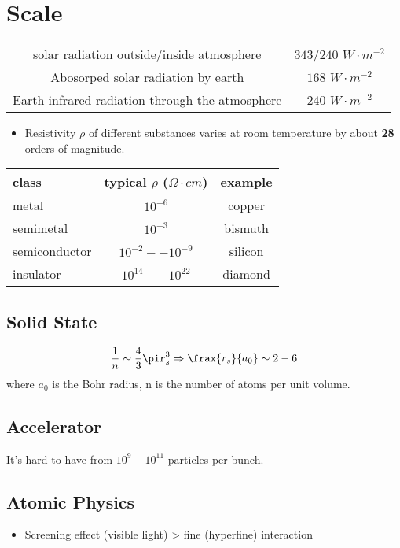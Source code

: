 \section{Scale}



\newpage
\begin{table}
    \centering
    \begin{tabular}{c | c}
	\hline
	solar radiation outside/inside atmosphere   & $343/240$ $W \cdot m^{-2}$	\\
	Abosorped solar radiation by earth  & $168$ $W \cdot m^{-2}$	\\
	Earth infrared radiation through the atmosphere	& $240$ $W \cdot m^{-2}$    \\
	\hline
    \end{tabular}
\end{table}

\begin{itemize}
    \item Resistivity $\rho$ of different substances varies at room temperature by about \textbf{28} orders of magnitude.
\end{itemize}

\begin{table}
    \centering
    \label{tab:resistivity} 
    \begin{tabular}{l c c}
	class	& typical $\rho$ ($\Omega \cdot cm$)	& example   \\
	\hline
	metal	& $10^{-6}$	& copper    \\
	semimetal   & $10^{-3}$	& bismuth   \\
	semiconductor	& $10^{-2} -- 10^{-9}$	&   silicon \\
	insulator   & $10^{14} -- 10^{22}$  & diamond	\\
    \end{tabular}
\end{table}
\subsection{Solid State}
\begin{equation}
    \frac{1}{n} \sim \frac{4}{3}\pir_s^3 \Rightarrow \frax{r_s}{a_0} \sim 2-6
\end{equation}
where $a_0$ is the Bohr radius, n is the number of atoms per unit volume.



\subsection{Accelerator}
It's hard to have from $10^9-10^{11}$ particles per bunch.



\subsection{Atomic Physics}
\begin{itemize}
    \item Screening effect (visible light) > fine (hyperfine) interaction
\end{itemize}
